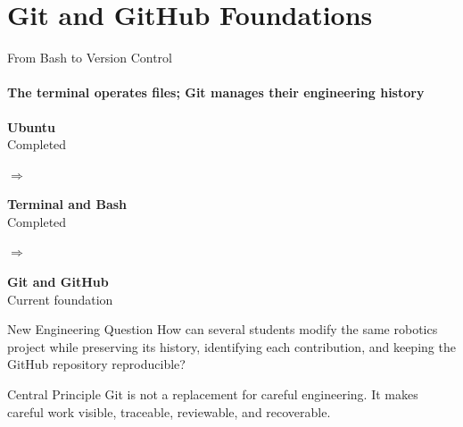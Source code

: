 \section{Git and GitHub Foundations}


\begin{frame}{From Bash to Version Control}
\framesubtitle{The terminal operates files; Git manages their engineering history}
\footnotesize
\begin{center}
\colorbox{um6p-color-dark-green!18}{\parbox[c][0.92cm][c]{2.15cm}{\centering\textbf{Ubuntu}\\\scriptsize Completed}}
\quad$\Longrightarrow$\quad
\colorbox{um6p-color-dark-green!18}{\parbox[c][0.92cm][c]{2.15cm}{\centering\textbf{Terminal and Bash}\\\scriptsize Completed}}
\quad$\Longrightarrow$\quad
\colorbox{um6p-color-light-blue}{\parbox[c][1.02cm][c]{2.25cm}{\centering\textbf{Git and GitHub}\\\scriptsize Current foundation}}
\end{center}
\begin{block}{New Engineering Question}
How can several students modify the same robotics project while preserving its history, identifying each contribution, and keeping the GitHub repository reproducible?
\end{block}
\begin{alertblock}{Central Principle}
Git is not a replacement for careful engineering. It makes careful work visible, traceable, reviewable, and recoverable.
\end{alertblock}
\end{frame}

